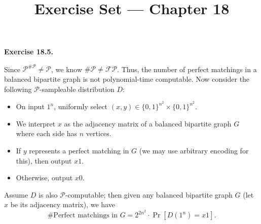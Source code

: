 \documentclass[a4paper]{article}
\title{Exercise Set --- Chapter 18}
\date{}
\newenvironment{exercise}[1]{
	\par
	\noindent\textbf{Exercise #1.}\quad
}{
	\par
	\bigskip
}
\newcommand{\sbra}[1]{\left[ #1 \right]}
\newcommand{\bin}{\{0,1\}}
\begin{document}
    \maketitle

    \begin{exercise}{18.5}
        Since $\mathcal P^{\#\mathcal P}\neq\mathcal P$, we know $\#\mathcal P\neq\mathcal{FP}$. Thus, the number of perfect matchings in a balanced bipartite graph is not polynomial-time computable. Now consider the following $\mathcal P$-sampleable distribution $D$:
        \begin{itemize}
        \item On input $1^n$, uniformly select $(x,y)\in\bin^{n^2}\times\bin^{n^2}$.
        \item We interpret $x$ as the adjacency matrix of a balanced bipartite graph $G$ where each side has $n$ vertices.
        \item If $y$ represents a perfect matching in $G$ (we may use arbitrary encoding for this), then output $x1$.
        \item Otherwise, output $x0$.
        \end{itemize}
        Assume $D$ is also $\mathcal P$-computable; then given any balanced bipartite graph $G$ (let $x$ be its adjacency matrix), we have
        $$
        \#\text{Perfect matchings in $G$}=2^{2n^2}\cdot\Pr\sbra{D(1^n)=x1}.
        $$
    \end{exercise}
\end{document}
